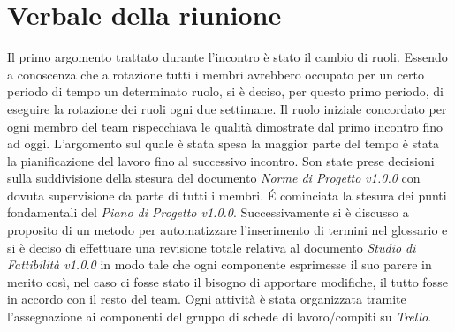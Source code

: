 \section{Verbale della riunione}
Il primo argomento trattato durante l'incontro è stato il cambio di ruoli.
Essendo a conoscenza che a rotazione tutti i membri avrebbero occupato per un 
certo periodo di tempo un determinato ruolo, si è deciso, per questo primo periodo, di 
eseguire la rotazione dei ruoli ogni due settimane. Il ruolo iniziale concordato 
per ogni membro del team rispecchiava le qualità dimostrate dal primo incontro 
fino ad oggi.
\newline \newline
L'argomento sul quale è stata spesa la maggior parte del tempo è stata la 
pianificazione del lavoro fino al successivo incontro. Son state prese decisioni 
sulla suddivisione della stesura del documento \textit{Norme di Progetto v1.0.0} con dovuta supervisione 
da parte di tutti i membri. \'E cominciata la stesura dei punti fondamentali del 
\textit{Piano di Progetto v1.0.0}. Successivamente si è discusso a proposito di 
un metodo per automatizzare l'inserimento di termini nel glossario e si è 
deciso di effettuare una revisione totale relativa al documento \textit{Studio di
Fattibilità v1.0.0} in modo tale che ogni componente esprimesse il suo parere in 
merito così, nel caso ci fosse stato il bisogno di apportare modifiche, il tutto 
fosse in accordo con il resto del team. Ogni attività è stata organizzata 
tramite l'assegnazione ai componenti del gruppo di schede di lavoro/compiti su 
\textit{Trello}. \\

\pagebreak

